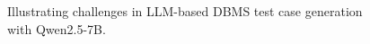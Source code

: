 \begin{figure}[t]



\caption{Illustrating challenges in LLM-based DBMS test case generation with Qwen2.5-7B.}
\label{fig:challenges}
\end{figure}

